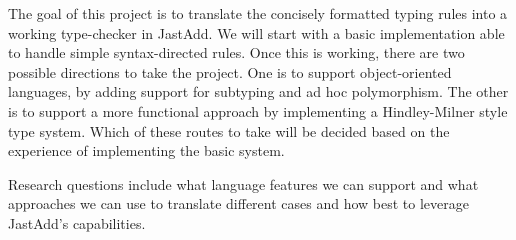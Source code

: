 \documentclass{article}
\begin{document}
The goal of this project is to translate the concisely formatted typing rules into a working type-checker in JastAdd.
We will start with a basic implementation able to handle simple syntax-directed rules.
Once this is working, there are two possible directions to take the project.
One is to support object-oriented languages, by adding support for subtyping and ad hoc polymorphism.
The other is to support a more functional approach by implementing a Hindley-Milner style type system.
Which of these routes to take will be decided based on the experience of implementing the basic system.

Research questions include what language features we can support and what approaches we can use to translate different cases and how best to leverage JastAdd's capabilities.




\end{document}
